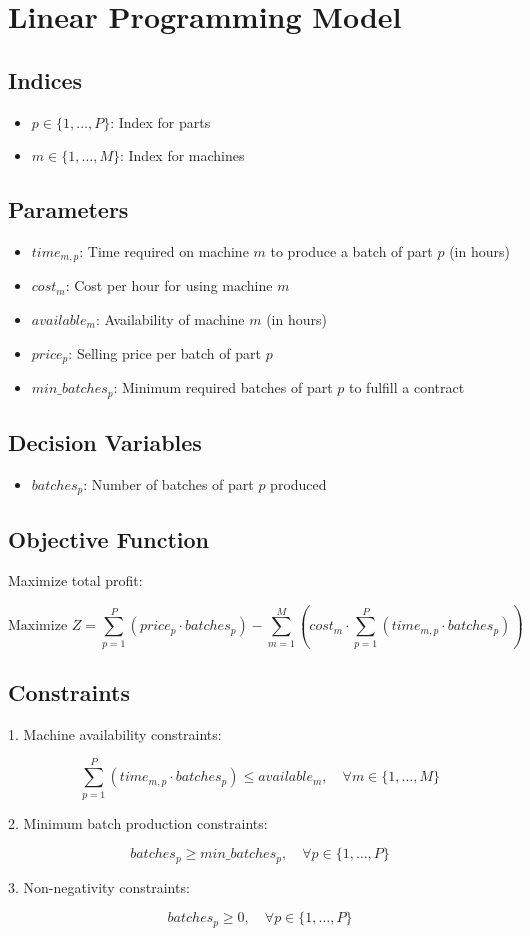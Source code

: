 \documentclass{article}
\begin{document}
\section*{Linear Programming Model}

\subsection*{Indices}
\begin{itemize}
    \item $p \in \{1, \ldots, P\}$: Index for parts
    \item $m \in \{1, \ldots, M\}$: Index for machines
\end{itemize}

\subsection*{Parameters}
\begin{itemize}
    \item $time_{m,p}$: Time required on machine $m$ to produce a batch of part $p$ (in hours)
    \item $cost_{m}$: Cost per hour for using machine $m$
    \item $available_{m}$: Availability of machine $m$ (in hours)
    \item $price_{p}$: Selling price per batch of part $p$
    \item $min\_batches_{p}$: Minimum required batches of part $p$ to fulfill a contract
\end{itemize}

\subsection*{Decision Variables}
\begin{itemize}
    \item $batches_{p}$: Number of batches of part $p$ produced
\end{itemize}

\subsection*{Objective Function}
Maximize total profit:

\[
\text{Maximize } Z = \sum_{p=1}^{P} (price_{p} \cdot batches_{p}) - \sum_{m=1}^{M} \left( cost_{m} \cdot \sum_{p=1}^{P} (time_{m,p} \cdot batches_{p}) \right)
\]

\subsection*{Constraints}
1. Machine availability constraints:

\[
\sum_{p=1}^{P} (time_{m,p} \cdot batches_{p}) \leq available_{m}, \quad \forall m \in \{1, \ldots, M\}
\]

2. Minimum batch production constraints:

\[
batches_{p} \geq min\_batches_{p}, \quad \forall p \in \{1, \ldots, P\}
\]

3. Non-negativity constraints:

\[
batches_{p} \geq 0, \quad \forall p \in \{1, \ldots, P\}
\]
\end{document}

